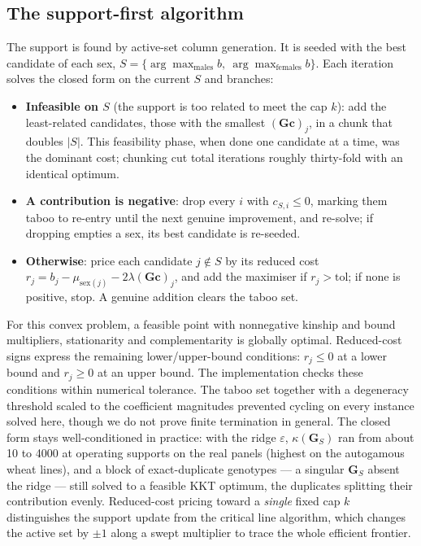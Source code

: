 \documentclass[11pt]{article}
\newcommand{\bc}{\mathbf{c}}
\newcommand{\bG}{\mathbf{G}}
\begin{document}
\subsection{The support-first algorithm}

The support is found by active-set column generation. It is seeded with the best candidate of each sex, $S=\{\arg\max_{\text{males}} b,\ \arg\max_{\text{females}} b\}$. Each iteration solves the closed form on the current $S$ and branches:

\begin{itemize}
\item \textbf{Infeasible on $S$} (the support is too related to meet the cap $k$): add the least-related candidates, those with the smallest $(\bG\bc)_j$, in a chunk that doubles $|S|$. This feasibility phase, when done one candidate at a time, was the dominant cost; chunking cut total iterations roughly thirty-fold with an identical optimum.
\item \textbf{A contribution is negative}: drop every $i$ with $c_{S,i}\le0$, marking them taboo to re-entry until the next genuine improvement, and re-solve; if dropping empties a sex, its best candidate is re-seeded.
\item \textbf{Otherwise}: price each candidate $j\notin S$ by its reduced cost $r_j=b_j-\mu_{\text{sex}(j)}-2\lambda(\bG\bc)_j$, and add the maximiser if $r_j>\text{tol}$; if none is positive, stop. A genuine addition clears the taboo set.
\end{itemize}

For this convex problem, a feasible point with nonnegative kinship and bound multipliers, stationarity and complementarity is globally optimal. Reduced-cost signs express the remaining lower/upper-bound conditions: $r_j\le0$ at a lower bound and $r_j\ge0$ at an upper bound. The implementation checks these conditions within numerical tolerance. The taboo set together with a degeneracy threshold scaled to the coefficient magnitudes prevented cycling on every instance solved here, though we do not prove finite termination in general. The closed form stays well-conditioned in practice: with the ridge $\varepsilon$, $\kappa(\bG_S)$ ran from about 10 to 4000 at operating supports on the real panels (highest on the autogamous wheat lines), and a block of exact-duplicate genotypes --- a singular $\bG_S$ absent the ridge --- still solved to a feasible KKT optimum, the duplicates splitting their contribution evenly. Reduced-cost pricing toward a \emph{single} fixed cap $k$ distinguishes the support update from the critical line algorithm, which changes the active set by $\pm1$ along a swept multiplier to trace the whole efficient frontier.
\end{document}
